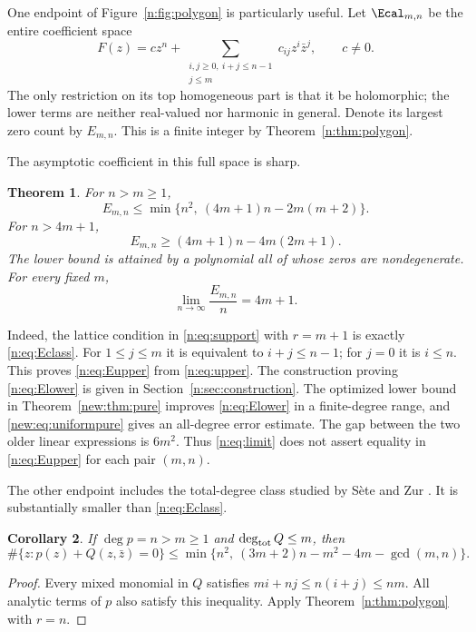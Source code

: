 \documentclass[UTF8,11pt]{ctexart}
\newtheorem{thm}{Theorem}[section]
\newtheorem{cor}[thm]{Corollary}
\theoremstyle{definition}
\numberwithin{equation}{section}
\begin{document}
One endpoint of Figure~\ref{n:fig:polygon} is particularly useful. Let
$\Ecal_{m,n}$ be the entire coefficient space
\begin{equation}\label{n:eq:Eclass}
 F(z)=c z^n+
 \sum_{\substack{i,j\ge0,\ i+j\le n-1\\j\le m}}c_{ij}z^i\bar z^j,
 \qquad c\ne0.
\end{equation}
The only restriction on its top homogeneous part is that it be holomorphic;
the lower terms are neither real-valued nor harmonic in general. Denote its
largest zero count by $E_{m,n}$. This is a finite integer by
Theorem~\ref{n:thm:polygon}.

The asymptotic coefficient in this full space is sharp.
\begin{thm}\label{n:thm:E}
For $n>m\ge1$,
\begin{equation}\label{n:eq:Eupper}
 E_{m,n}\le\min\{n^2,\ (4m+1)n-2m(m+2)\}.
\end{equation}
For $n>4m+1$,
\begin{equation}\label{n:eq:Elower}
 E_{m,n}\ge(4m+1)n-4m(2m+1).
\end{equation}
The lower bound is attained by a polynomial all of whose zeros are
nondegenerate. For every fixed $m$,
\begin{equation}\label{n:eq:limit}
 \lim_{n\to\infty}\frac{E_{m,n}}n=4m+1.
\end{equation}
\end{thm}

Indeed, the lattice condition in \eqref{n:eq:support} with $r=m+1$ is exactly
\eqref{n:eq:Eclass}. For $1\le j\le m$ it is equivalent to $i+j\le n-1$;
for $j=0$ it is $i\le n$. This proves \eqref{n:eq:Eupper} from
\eqref{n:eq:upper}. The construction proving \eqref{n:eq:Elower} is given in
Section~\ref{n:sec:construction}. The optimized lower bound in Theorem~\ref{new:thm:pure} improves \eqref{n:eq:Elower} in a finite-degree range, and \eqref{new:eq:uniformpure} gives an all-degree error estimate. The gap between the two older linear expressions
is $6m^2$. Thus \eqref{n:eq:limit} does not assert equality in
\eqref{n:eq:Eupper} for each pair $(m,n)$.

The other endpoint includes the total-degree class studied by S\`ete and Zur
\cite[Section~5]{SZ24}. It is substantially smaller than \eqref{n:eq:Eclass}.
\begin{cor}\label{n:cor:total}
If $\deg p=n>m\ge1$ and $\deg_{\rm tot}Q\le m$, then
\begin{equation}\label{n:eq:total}
 \#\{z:p(z)+Q(z,\bar z)=0\}
 \le\min\{n^2,\ (3m+2)n-m^2-4m-\gcd(m,n)\}.
\end{equation}
\end{cor}
\begin{proof}
Every mixed monomial in $Q$ satisfies
$mi+nj\le n(i+j)\le nm$. All analytic terms of $p$ also satisfy this
inequality. Apply Theorem~\ref{n:thm:polygon} with $r=n$.
\end{proof}
\end{document}
